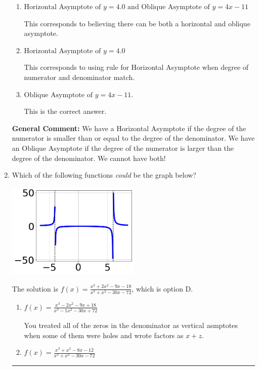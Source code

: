 \documentclass{extbook}[14pt]
\newcommand{\litem}[1]{\item #1

\rule{\textwidth}{0.4pt}}
\begin{document}
\begin{enumerate}
{\begin{enumerate}[label=\Alph*.]
This corresponds to considering where the denominator is equal to 0 as horizontal asymptote.
\item \( \text{Horizontal Asymptote of } y = 4.0 \text{ and Oblique Asymptote of } y = 4x -11 \)

This corresponds to believing there can be both a horizontal and oblique asymptote.
\item \( \text{Horizontal Asymptote of } y = 4.0  \)

This corresponds to using rule for Horizontal Asymptote when degree of numerator and denominator match.
\item \( \text{Oblique Asymptote of } y = 4x -11. \)

This is the correct answer.
\end{enumerate}

\textbf{General Comment:} We have a Horizontal Asymptote if the degree of the numerator is smaller than or equal to the degree of the denominator. We have an Oblique Asymptote if the degree of the numerator is larger than the degree of the denominator. We cannot have both!
}
\litem{
Which of the following functions \textit{could} be the graph below?

\begin{center}
    \includegraphics[width=0.5\textwidth]{../Figures/identifyGraphOfRationalFunctionB.png}
\end{center}




The solution is \( f(x)=\frac{x^{3} +2 x^{2} -9 x -18}{x^{3} + x^{2} -30 x -72} \), which is option D.\begin{enumerate}[label=\Alph*.]
\item \( f(x)=\frac{x^{3} -2 x^{2} -9 x + 18}{x^{3} -1 x^{2} -30 x + 72} \)

You treated all of the zeros in the denominator as vertical asmptotes when some of them were holes and wrote factors as $x+z$.
\item \( f(x)=\frac{x^{3} + x^{2} -8 x -12}{x^{3} + x^{2} -30 x -72} \)


\end{enumerate}}
\end{enumerate}
\end{document}
